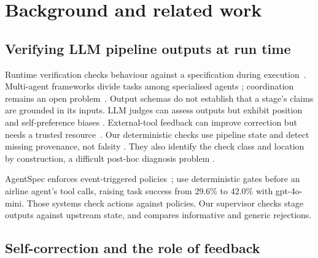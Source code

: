 \section{Background and related work}
\label{sec:related}

\subsection{Verifying LLM pipeline outputs at run time}
\label{sec:related-rv}

Runtime verification checks behaviour against a specification during
execution~\citep{leucker2009rv}. Multi-agent frameworks divide tasks among
specialised agents \citep{metagpt,camel,chatdev,autogen}; coordination remains
an open problem~\citep{guo2024survey}. Output schemas do not establish that a
stage's claims are grounded in its inputs. LLM judges \citep{geval,mtbench}
can assess outputs but exhibit position and self-preference biases
\citep{positionbias,selfpreference}. External-tool feedback can improve
correction but needs a trusted resource~\citep{critic}. Our deterministic
checks use pipeline state and detect missing provenance, not falsity
\citep{hoang2026eas}. They also identify the check class and location by
construction, a difficult post-hoc diagnosis problem
\citep{tan2026agentchaos}.

AgentSpec enforces event-triggered policies~\citep{wang2026agentspec};
\citet{reddy2026gates} use deterministic gates before an airline agent's tool
calls, raising task success from 29.6\% to 42.0\% with gpt-4o-mini. Those
systems check actions against policies. Our supervisor checks stage outputs
against upstream state, and compares informative and generic rejections.

\subsection{Self-correction and the role of feedback}
\label{sec:related-selfcorrection}


